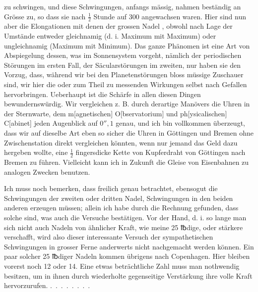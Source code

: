 \par\noindent zu schwingen, und diese Schwingungen, anfangs mässig, nahmen beständig an
Grösse zu, so dass sie nach \(\frac{1}{2}\) Stunde auf 300 angewachsen waren. Hier sind
nun aber die Elongationen mit denen der grossen Nadel , obwohl
nach Lage der Umstände entweder gleichnamig (d. i. Maximum mit
Maximum) oder ungleichnamig (Maximum mit Minimum). Das ganze Phänomen
ist eine Art von Abspiegelung dessen, was im Sonnensystem vorgeht,
nämlich der periodischen Störungen im ersten Fall, der Säcularstörungen im
zweiten, nur haben sie den Vorzug, dass, während wir bei den Planetenstörungen
bloss müssige Zuschauer sind, wir hier die  oder zum
Theil  zu messenden Wirkungen selbst nach Gefallen
hervorbringen. Ueberhaupt ist die Schärfe in allen diesen Dingen bewundernswürdig.
Wir vergleichen z. B. durch derartige Manövers die Uhren in der
Sternwarte, dem m[agnetischen] O[bservatorium] und ph[ysicalischen] C[abinet]
jeden Augenblick auf \(0''{,}1\) genau, und ich bin vollkommen überzeugt, dass
wir auf dieselbe Art eben so sicher die Uhren in Göttingen und Bremen ohne
Zwischenstation direkt vergleichen könnten, wenn nur jemand das Geld dazu
hergeben wollte, eine \(\frac{1}{2}\) fingersdicke Kette von Kupferdraht von Göttingen
\clearpage{}
\noindent nach Bremen zu führen. Vielleicht kann ich in Zukunft die Gleise von
Eisenbahnen zu analogen Zwecken benutzen.

Ich muss noch bemerken, dass freilich genau betrachtet, ebensogut die
Schwingungen der zweiten oder dritten Nadel, Schwingungen in den beiden
anderen erzeugen müssen; allein ich habe durch die Rechnung gefunden, dass
solche  sind, was auch die Versuche bestätigen. Vor der Hand,
d. i. so lange man sich nicht auch Nadeln von ähnlicher Kraft, wie meine
25 {℔}dige, oder stärkere verschafft, wird also dieser interessante Versuch der
sympathetischen Schwingungen in grosser Ferne anderwerts nicht nachgemacht
werden können. Ein paar solcher 25 {℔}diger Nadeln kommen übrigens
nach Copenhagen. Hier bleiben vorerst noch 12 oder 14. Eine etwas beträchtliche
Zahl muss man nothwendig besitzen, um in ihnen durch wiederholte
gegenseitige Verstärkung ihre volle Kraft hervorzurufen. \mbox{.\ .\ .\ .\ .\ .\ .\ .}
\clearpage\endgroup
